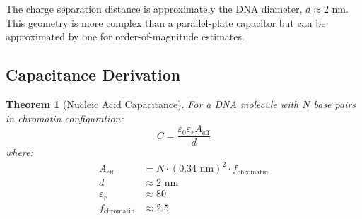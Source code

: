 \documentclass[twocolumn,10pt]{article}
\newtheorem{theorem}{Theorem}[section]
\theoremstyle{remark}
\begin{document}
The charge separation distance is approximately the DNA diameter, $d \approx 2$ nm. This geometry is more complex than a parallel-plate capacitor but can be approximated by one for order-of-magnitude estimates.

\subsection{Capacitance Derivation}

\begin{theorem}[Nucleic Acid Capacitance]
\label{thm:capacitance}
For a DNA molecule with $N$ base pairs in chromatin configuration:
\begin{equation}
C = \frac{\varepsilon_0 \varepsilon_r A_{\mathrm{eff}}}{d}
\end{equation}
where:
\begin{align}
A_{\mathrm{eff}} &= N \cdot (0.34 \text{ nm})^2 \cdot f_{\mathrm{chromatin}} \\
d &\approx 2 \text{ nm} \\
\varepsilon_r &\approx 80 \\
f_{\mathrm{chromatin}} &\approx 2.5
\end{align}
\end{theorem}
\end{document}
